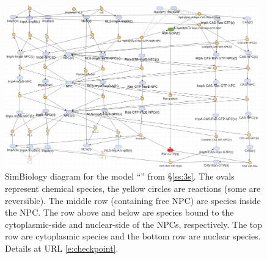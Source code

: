 \documentclass[12pt,notitlepage]{article}
\begin{document}
\begin{figure} %
	\centering
	\includegraphics[width=0.99\textwidth]{20211018-Appli/threestage}
	\caption{%
		SimBiology diagram for the model 
		``'' from \S\ref{ss:3s}.
		The ovals represent chemical species,
		the yellow circles are reactions
		(some are reversible).
		The middle row (containing free NPC)
		are species inside the NPC.
		The row above and below are species
		bound to 
		the cytoplasmic-side and nuclear-side 
		of the NPCs, respectively.
		The top row are cytoplasmic species
		and
		the bottom row are nuclear species.
		Details at URL \eqref{e:checkpoint}.
	}
	\label{f:app:3s-simbio}
\end{figure}


\clearpage
\end{document}
